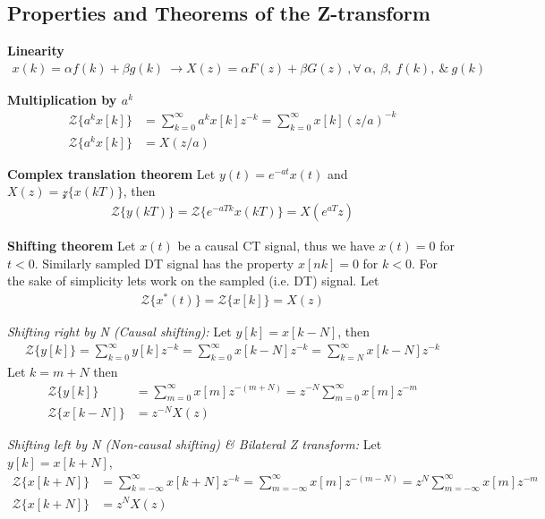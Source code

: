 \documentclass[twoside]{article}
\begin{document}
\subsection*{Properties and Theorems of the Z-transform}

\textbf{Linearity}
%
\begin{align*}
  x(k) = \alpha f(k) + \beta g(k) \ \rightarrow X(z) = \alpha F(z) +
  \beta G(z) \ , \forall \ \alpha, \ \beta, \ f(k), \ \& \ g(k)
\end{align*}

\textbf{Multiplication by $a^k$}
%
\begin{align*}
\mathcal{Z} \lbrace a^k x[k] \rbrace &= \sum\limits_{k=0}^{\infty} 
  a^k x[k] z^{-k} = \sum\limits_{k=0}^{\infty}  x[k] (z/a)^{-k} 
\\
\mathcal{Z} \lbrace a^k x[k] \rbrace &= X(z/a)
\end{align*}

\textbf{Complex translation theorem}
%
Let $y(t) = e^{-a t} x(t)$ and $X(z) = \mathcal{z} \lbrace x(k T)
\rbrace$, then
%
\begin{align*}
\mathcal{Z} \lbrace y(k T) \rbrace = \mathcal{Z} \lbrace e^{-a T k}
  x(k T) \rbrace = X(e^{a T} z)
\end{align*}

\textbf{Shifting theorem}
%
Let $x(t)$ be a causal CT signal, thus we have $x(t) = 0$ for 
$t < 0$. Similarly sampled DT signal has the property $x[nk] = 0$ for $k <
0$. For the sake of simplicity lets work on the sampled (i.e. DT)
signal. Let
%
\begin{align*}
\mathcal{Z} \lbrace x^*(t) \rbrace = \mathcal{Z} \lbrace x[k] \rbrace = X(z)
\end{align*}

\textit{Shifting right by N (Causal shifting):} Let $y[k] = x[k - N]$,
then
\begin{align*}
\mathcal{Z} \lbrace y[k]\rbrace = \sum\limits_{k=0}^{\infty} y[k] z^{-k}
= \sum\limits_{k=0}^{\infty} x[k - N] z^{-k} = \sum\limits_{k=N}^{\infty} x[k - N] z^{-k}
\end{align*}
%
Let $k = m + N$ then 
%
\begin{align*}
\mathcal{Z} \lbrace y[k]\rbrace &= \sum\limits_{m=0}^{\infty} x[m]
  z^{-(m+N)} = z^{-N} \sum\limits_{m=0}^{\infty} x[m]
  z^{-m}  
\\
\mathcal{Z} \lbrace x[k-N]\rbrace &= z^{-N} X(z)
\end{align*}

\textit{Shifting left by N (Non-causal shifting) \& Bilateral Z
  transform:}  Let $y[k] = x[k + N]$,
%
\begin{align*}
\mathcal{Z} \lbrace x[k+N]\rbrace &= \sum\limits_{k=-\infty}^{\infty}
  x[k +N] z^{-k} = \sum\limits_{m=-\infty}^{\infty} x[m] z^{-(m-N)} 
= z^N \sum\limits_{m=-\infty}^{\infty} x[m] z^{-m} 
\\
\mathcal{Z} \lbrace x[k+N]\rbrace &= z^N X(z)
\end{align*}
\end{document}
